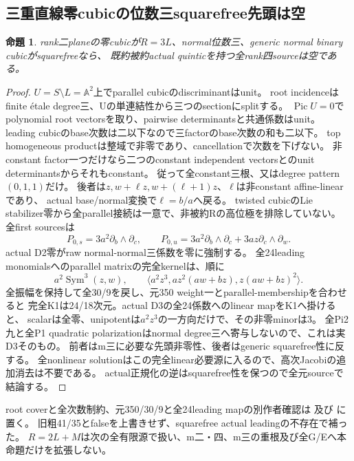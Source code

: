 \documentclass[a4paper,11pt]{ltjsarticle}
\newtheorem{proposition}{命題}[section]
\theoremstyle{definition}
\begin{document}
\subsection{三重直線零cubicの位数三squarefree先頭は空}
\begin{proposition}\label{prop:plane-triple-line-m3-squarefree-empty}
rank二planeの零cubicが$R=3L$、normal位数三、generic normal binary cubicがsquarefreeなら、
既約被約actual quinticを持つ全rank四sourceは空である。
\end{proposition}
\begin{proof}
$U=S\setminus L=\mathbb A^2$上でparallel cubicのdiscriminantはunit。
root incidenceはfinite \'etale degree三、Uの単連結性から三つのsectionにsplitする。
$\operatorname{Pic}U=0$でpolynomial root vectorsを取り、pairwise determinantsと共通係数はunit。
leading cubicのbase次数は二以下なので三factorのbase次数の和も二以下。
top homogeneous productは整域で非零であり、cancellationで次数を下げない。
非constant factor一つだけなら二つのconstant independent vectorsとのunit determinantsからそれもconstant。
従って全constant三根、又はdegree pattern$(0,1,1)$だけ。
後者は$z,w+\ell z,w+(\ell+1)z$、$\ell$は非constant affine-linearであり、
actual base/normal変換で$\ell=b/a$へ戻る。
twisted cubicのLie stabilizer零から全parallel接続は一意で、非被約Rの高位極を排除していない。
全first sourcesは
\[
 P_{0,s}=3a^2\partial_b\wedge\partial_c,\qquad
 P_{0,u}=3a^2\partial_b\wedge\partial_c+3az\partial_c\wedge\partial_w.
\]
actual D2零がraw normal-normal三係数を零に強制する。
全24leading monomialsへのparallel matrixの完全kernelは、順に
\[
 a^2\operatorname{Sym}^3(z,w),\qquad
 \langle a^2z^3,az^2(aw+bz),z(aw+bz)^2\rangle.
\]
全振幅を保持して全30/9を戻し、元350 weight一とparallel-membershipを合わせると
完全K1は24/18次元。actual D3の全24係数へのlinear mapをK1へ掛けると、
scalarは全零、unipotentは$a^2z^3$の一方向だけで、その非零minorは3。
全Pi2九と全P1 quadratic polarizationはnormal degree三へ寄与しないので、これは実D3そのもの。
前者はm三に必要な先頭非零性、後者はgeneric squarefree性に反する。
全nonlinear solutionはこの完全linear必要源に入るので、高次Jacobiの追加消去は不要である。
actual正規化の逆はsquarefree性を保つので全元sourceで結論する。
\end{proof}
root coverと全次数制約、元350/30/9と全24leading mapの別作者確認は
及び
に置く。
旧粗41/35とfalseを上書きせず、squarefree actual leadingの不存在で補った。
$R=2L+M$は次の全有限源で扱い、m二・四、m三の重根及び全G/Eへ本命題だけを拡張しない。
\end{document}
